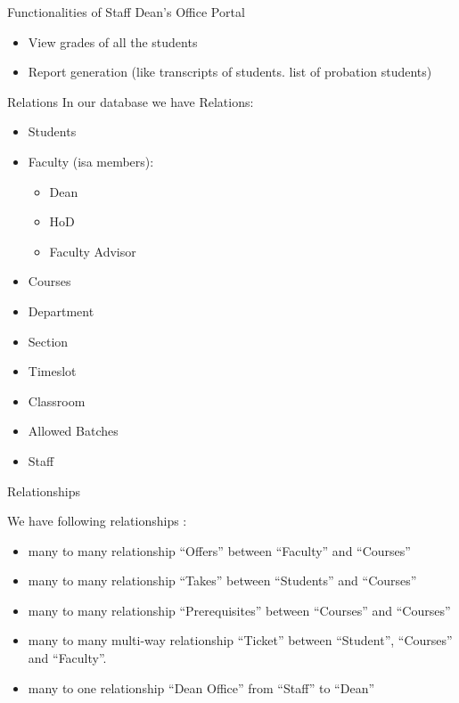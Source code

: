 \documentclass{beamer}
\begin{document}
\begin{frame}{Functionalities of Staff Dean's Office Portal}
\begin{itemize}
\item View grades of all the students
\item Report generation (like transcripts of students. list of probation students)
\end{itemize}
\end{frame}

\begin{frame}{Relations}
In our database we have Relations:

\begin{itemize}
\item Students
\item Faculty (isa members):
\begin{itemize}
\item Dean
\item HoD
\item Faculty Advisor
\end{itemize}
\item Courses
\item Department
\item Section
\item Timeslot
\item Classroom
\item Allowed Batches
\item Staff
\end{itemize}
\end{frame}
\begin{frame}{Relationships}

We have following relationships :
\begin{itemize}
\item many to many relationship ``Offers'' between ``Faculty'' and ``Courses''
\item many to many relationship ``Takes'' between ``Students'' and ``Courses''
\item many to many relationship ``Prerequisites'' between  ``Courses'' and ``Courses''
\item many to many multi-way relationship ``Ticket'' between ``Student'', ``Courses'' and ``Faculty''.
\item many to one relationship ``Dean Office'' from ``Staff'' to ``Dean''
\end{itemize}
\end{frame}
\end{document}
